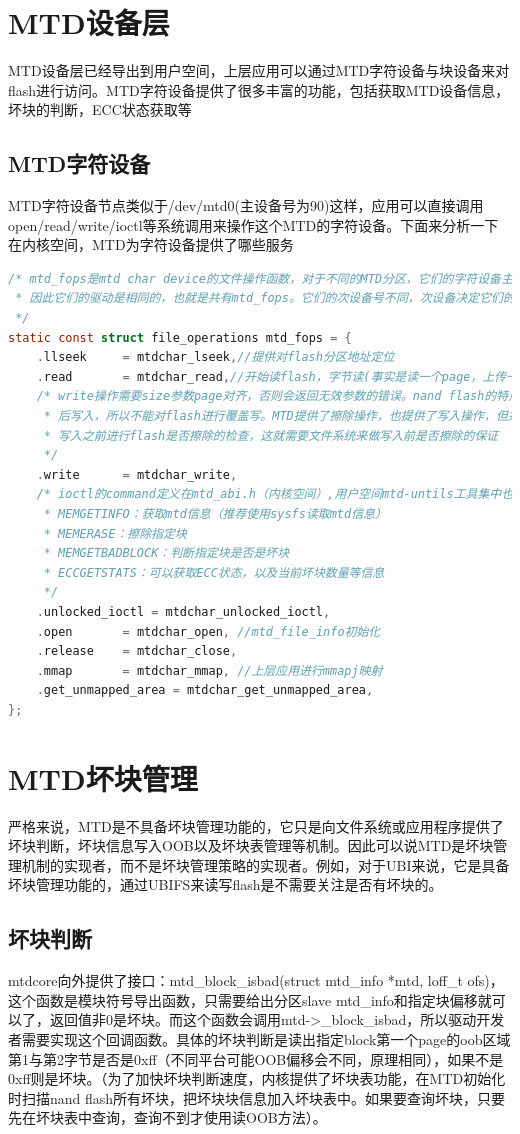 \section{MTD设备层}
MTD设备层已经导出到用户空间，上层应用可以通过MTD字符设备与块设备来对flash进行访问。MTD字符设备提供了很多丰富的功能，包括获取MTD设备信息，坏块的判断，ECC状态获取等
\subsection{MTD字符设备}
MTD字符设备节点类似于/dev/mtd0(主设备号为90)这样，应用可以直接调用open/read/write/ioctl等系统调用来操作这个MTD的字符设备。下面来分析一下在内核空间，MTD为字符设备提供了哪些服务
\begin{lstlisting}[language=C]
/* mtd_fops是mtd char device的文件操作函数，对于不同的MTD分区，它们的字符设备主设备号都是90。
 * 因此它们的驱动是相同的，也就是共有mtd_fops。它们的次设备号不同，次设备决定它们的设备文件是什么
 */
static const struct file_operations mtd_fops = {
	.llseek		= mtdchar_lseek,//提供对flash分区地址定位
	.read		= mtdchar_read,//开始读flash，字节读(事实是读一个page，上传一个字节而已)
	/* write操作需要size参数page对齐，否则会返回无效参数的错误。nand flash的特点是先擦除，
	 * 后写入，所以不能对flash进行覆盖写。MTD提供了擦除操作，也提供了写入操作，但并不会在
	 * 写入之前进行flash是否擦除的检查，这就需要文件系统来做写入前是否擦除的保证
	 */
	.write		= mtdchar_write,
	/* ioctl的command定义在mtd_abi.h（内核空间）,用户空间mtd-untils工具集中也在mtd_abi.h中
	 * MEMGETINFO：获取mtd信息（推荐使用sysfs读取mtd信息）
	 * MEMERASE：擦除指定块
	 * MEMGETBADBLOCK：判断指定块是否是坏块
	 * ECCGETSTATS：可以获取ECC状态，以及当前坏块数量等信息
	 */
	.unlocked_ioctl	= mtdchar_unlocked_ioctl,
	.open		= mtdchar_open, //mtd_file_info初始化
	.release	= mtdchar_close,
	.mmap		= mtdchar_mmap, //上层应用进行mmapj映射
	.get_unmapped_area = mtdchar_get_unmapped_area,
};
\end{lstlisting}

\section{MTD坏块管理}
严格来说，MTD是不具备坏块管理功能的，它只是向文件系统或应用程序提供了坏块判断，坏块信息写入OOB以及坏块表管理等机制。因此可以说MTD是坏块管理机制的实现者，而不是坏块管理策略的实现者。例如，对于UBI来说，它是具备坏块管理功能的，通过UBIFS来读写flash是不需要关注是否有坏块的。
\subsection{坏块判断}
mtdcore向外提供了接口：mtd\_block\_isbad(struct mtd\_info *mtd, loff\_t ofs)，这个函数是模块符号导出函数，只需要给出分区slave mtd\_info和指定块偏移就可以了，返回值非0是坏块。而这个函数会调用mtd->\_block\_isbad，所以驱动开发者需要实现这个回调函数。具体的坏块判断是读出指定block第一个page的oob区域第1与第2字节是否是0xff（不同平台可能OOB偏移会不同，原理相同），如果不是0xff则是坏块。（为了加快坏块判断速度，内核提供了坏块表功能，在MTD初始化时扫描nand flash所有坏块，把坏块块信息加入坏块表中。如果要查询坏块，只要先在坏块表中查询，查询不到才使用读OOB方法）。
